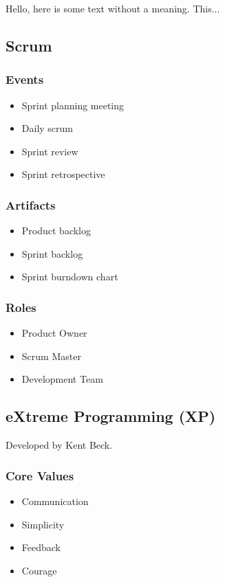 \documentclass[../ESOF_notes.tex]{subfiles}
\begin{document}
 
Hello, here is some text without a meaning.  This...
\subsection{Scrum}
\subsubsection{Events}
\begin{itemize}
    \item Sprint planning meeting
    \item Daily scrum
    \item Sprint review
    \item Sprint retrospective
\end{itemize}

\subsubsection{Artifacts}

\begin{itemize}
    \item Product backlog
    \item Sprint backlog
    \item Sprint burndown chart
\end{itemize}

\subsubsection{Roles}

\begin{itemize}
    \item Product Owner
    \item Scrum Master
    \item Development Team
\end{itemize}

\subsection{eXtreme Programming (XP)}

Developed by Kent Beck.

\subsubsection{Core Values}

\begin{itemize}
    \item Communication
    \item Simplicity
    \item Feedback
    \item Courage
\end{itemize}
\end{document}
